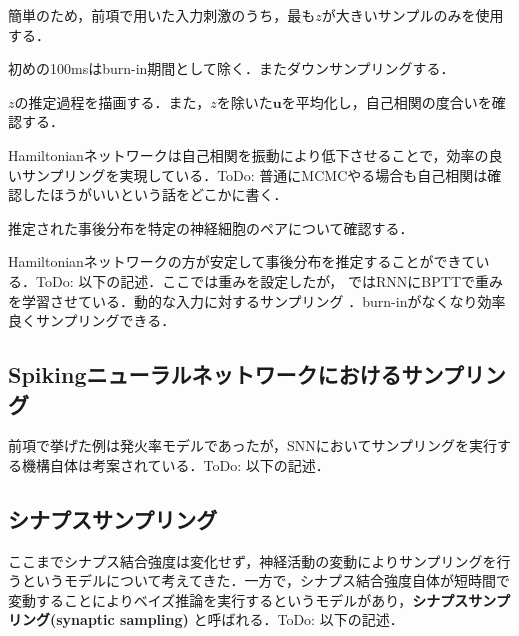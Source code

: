 簡単のため，前項で用いた入力刺激のうち，最も$z$が大きいサンプルのみを使用する．






初めの100msはburn-in期間として除く．またダウンサンプリングする．


$z$の推定過程を描画する．また，$z$を除いた$\mathbf{u}$を平均化し，自己相関の度合いを確認する．


Hamiltonianネットワークは自己相関を振動により低下させることで，効率の良いサンプリングを実現している．ToDo: 普通にMCMCやる場合も自己相関は確認したほうがいいという話をどこかに書く．

推定された事後分布を特定の神経細胞のペアについて確認する．



Hamiltonianネットワークの方が安定して事後分布を推定することができている．ToDo: 以下の記述．ここでは重みを設定したが， \cite{Echeveste2020-sh}ではRNNにBPTTで重みを学習させている．動的な入力に対するサンプリング \cite{Berkes2011-xj}．burn-inがなくなり効率良くサンプリングできる．
\subsection{Spikingニューラルネットワークにおけるサンプリング}
前項で挙げた例は発火率モデルであったが，SNNにおいてサンプリングを実行する機構自体は考案されている．ToDo: 以下の記述．\cite{Buesing2011-dm}\cite{Masset2022-wh}\cite{Zhang2022-bl}
\subsection{シナプスサンプリング}
ここまでシナプス結合強度は変化せず，神経活動の変動によりサンプリングを行うというモデルについて考えてきた．一方で，シナプス結合強度自体が短時間で変動することによりベイズ推論を実行するというモデルがあり，\textbf{シナプスサンプリング(synaptic sampling)} と呼ばれる．ToDo: 以下の記述．\cite{Kappel2015-kq}\cite{Aitchison2021-wo}
